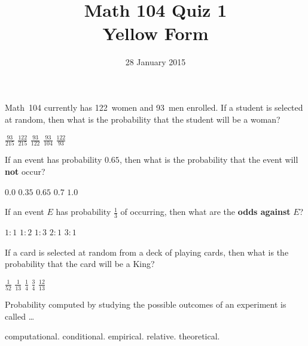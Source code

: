 \documentclass[answers,12pt]{exam}
\title{Math 104 Quiz 1\\Yellow Form}
\date{28 January 2015}
\begin{document}
\maketitle
\begin{center}
\end{center}

\begin{questions}
\question Math~104 currently has 122~women and 93~men enrolled.
If a student is selected at random, then what is the probability
that the student will be a woman?\\
\begin{oneparchoices}
\choice $\frac{93}{215}$
\correctchoice $\frac{122}{215}$
\choice $\frac{93}{122}$
\choice $\frac{93}{104}$
\choice $\frac{122}{93}$
\end{oneparchoices}

\question If an event has probability $0.65$,
then what is the probability that the event will
{\bf not} occur?\\
\begin{oneparchoices}
\choice $0.0$
\correctchoice $0.35$
\choice $0.65$
\choice $0.7$
\choice $1.0$
\end{oneparchoices}

\question If an event $E$ has probability $\frac{1}{3}$
of occurring, then what are the {\bf odds against} $E$?\\
\begin{oneparchoices}
\choice $1:1$
\choice $1:2$ %
\choice $1:3$ %
\correctchoice $2:1$
\choice $3:1$ %
\end{oneparchoices}

\question If a card is selected at random from a deck of
playing cards, then what is the probability that
the card will be a King?\\
\begin{oneparchoices}
\choice $\frac{1}{52}$
\correctchoice $\frac{1}{13}$
\choice $\frac{1}{4}$
\choice $\frac{3}{4}$
\choice $\frac{12}{13}$
\end{oneparchoices}

\question Probability computed by studying
the possible outcomes of an experiment is called \dots\\
\begin{oneparchoices}
\choice computational.
\choice conditional.
\choice empirical.
\choice relative.
\correctchoice theoretical.
\end{oneparchoices}


\end{questions}
\end{document}
